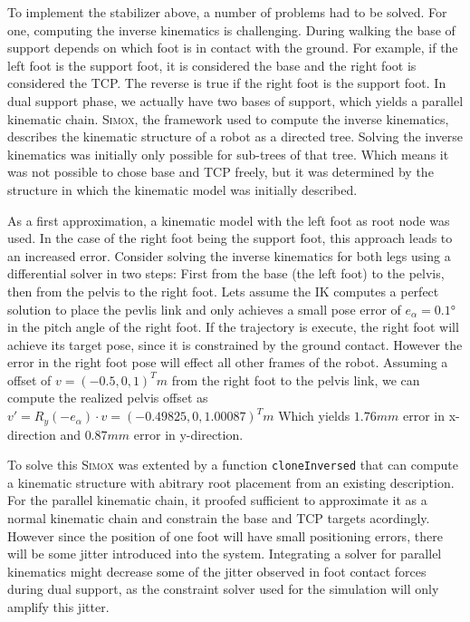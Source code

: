 \documentclass[english,ngerman]{KITreprt}
\newcommand{\name}[1]{\textsc{#1}}
\begin{document}
To implement the stabilizer above, a number of problems had to be
solved. For one, computing the inverse kinematics is challenging. During
walking the base of support depends on which foot is in contact with the
ground. For example, if the left foot is the support foot, it is
considered the base and the right foot is considered the TCP. The
reverse is true if the right foot is the support foot. In dual support
phase, we actually have two bases of support, which yields a parallel
kinematic chain. \name{Simox}, the framework used to compute the inverse
kinematics, describes the kinematic structure of a robot as a directed
tree. Solving the inverse kinematics was initially only possible for
sub-trees of that tree. Which means it was not possible to chose base
and TCP freely, but it was determined by the structure in which the
kinematic model was initially described.

As a first approximation, a kinematic model with the left foot as root
node was used. In the case of the right foot being the support foot,
this approach leads to an increased error. Consider solving the inverse
kinematics for both legs using a differential solver in two steps: First
from the base (the left foot) to the pelvis, then from the pelvis to the
right foot. Lets assume the IK computes a perfect solution to place the
pevlis link and only achieves a small pose error of $e_{\alpha} = 0.1°$
in the pitch angle of the right foot. If the trajectory is execute, the
right foot will achieve its target pose, since it is constrained by the
ground contact. However the error in the right foot pose will effect all
other frames of the robot. Assuming a offset of $v = (-0.5, 0, 1)^T m$
from the right foot to the pelvis link, we can compute the realized
pelvis offset as
$v' = R_y(-e_{\alpha}) \cdot v = (-0.49825, 0,  1.00087)^T m$ Which
yields $1.76mm$ error in x-direction and $0.87mm$ error in y-direction.

To solve this \name{Simox} was extented by a function
\texttt{cloneInversed} that can compute a kinematic structure with
abitrary root placement from an existing description. For the parallel
kinematic chain, it proofed sufficient to approximate it as a normal
kinematic chain and constrain the base and TCP targets acordingly.
However since the position of one foot will have small positioning
errors, there will be some jitter introduced into the system.
Integrating a solver for parallel kinematics might decrease some of the
jitter observed in foot contact forces during dual support, as the
constraint solver used for the simulation will only amplify this jitter.
\end{document}
